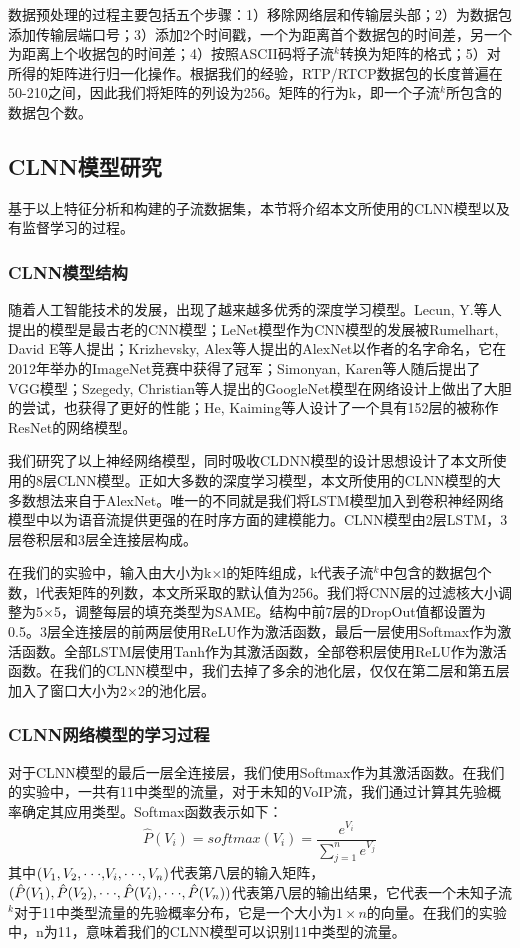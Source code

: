 数据预处理的过程主要包括五个步骤：1）移除网络层和传输层头部；2）为数据包添加传输层端口号；3）添加2个时间戳，一个为距离首个数据包的时间差，另一个为距离上个收据包的时间差；4）按照ASCII码将子流$^k$转换为矩阵的格式；5）对所得的矩阵进行归一化操作。根据我们的经验，RTP/RTCP数据包的长度普遍在50-210之间，因此我们将矩阵的列设为256。矩阵的行为k，即一个子流$^k$所包含的数据包个数。

\subsection{CLNN模型研究}
基于以上特征分析和构建的子流数据集，本节将介绍本文所使用的CLNN模型以及有监督学习的过程。
\subsubsection{CLNN模型结构}
随着人工智能技术的发展，出现了越来越多优秀的深度学习模型。Lecun, Y.等人\supercite{6}提出的模型是最古老的CNN模型；LeNet模型作为CNN模型的发展被Rumelhart, David E\supercite{7}等人提出；Krizhevsky, Alex\supercite{8}等人提出的AlexNet以作者的名字命名，它在2012年举办的ImageNet竞赛中获得了冠军；Simonyan, Karen\supercite{9}等人随后提出了VGG模型；Szegedy, Christian\supercite{10}等人提出的GoogleNet模型在网络设计上做出了大胆的尝试，也获得了更好的性能；He, Kaiming\supercite{11}等人设计了一个具有152层的被称作ResNet的网络模型。

我们研究了以上神经网络模型，同时吸收CLDNN模型\supercite{clnn}的设计思想设计了本文所使用的8层CLNN模型。正如大多数的深度学习模型，本文所使用的CLNN模型的大多数想法来自于AlexNet。唯一的不同就是我们将LSTM模型加入到卷积神经网络模型中以为语音流提供更强的在时序方面的建模能力。CLNN模型由2层LSTM，3层卷积层和3层全连接层构成。

在我们的实验中，输入由大小为k$\times$l的矩阵组成，k代表子流$^k$中包含的数据包个数，l代表矩阵的列数，本文所采取的默认值为256。我们将CNN层的过滤核大小调整为5$\times$5，调整每层的填充类型为SAME。结构中前7层的DropOut值都设置为0.5。3层全连接层的前两层使用ReLU作为激活函数，最后一层使用Softmax作为激活函数。全部LSTM层使用Tanh作为其激活函数，全部卷积层使用ReLU作为激活函数。在我们的CLNN模型中，我们去掉了多余的池化层，仅仅在第二层和第五层加入了窗口大小为2$\times$2的池化层。

\subsubsection{CLNN网络模型的学习过程}
对于CLNN模型的最后一层全连接层，我们使用Softmax作为其激活函数。在我们的实验中，一共有11中类型的流量，对于未知的VoIP流，我们通过计算其先验概率确定其应用类型。Softmax函数表示如下：
\begin{equation}
\hat P({V_i}) = softmax({V_i}) = \frac{{{e^{{V_i}}}}}{{\sum\limits_{j = 1}^n {{e^{{V_j}}}} }}
\end{equation}
其中$({V_1},{V_2},{\rm{\cdot\cdot\cdot,}}{V_i},{\rm{\cdot\cdot\cdot}},{V_n})$代表第八层的输入矩阵，$(\hat P({V_1}),\hat P({V_2}),{\rm{\cdot\cdot\cdot}},\hat P({V_i}),{\rm{\cdot\cdot\cdot}},\hat P({V_n}))$代表第八层的输出结果，它代表一个未知子流$^k$对于11中类型流量的先验概率分布，它是一个大小为$1 \times n$的向量。在我们的实验中，n为11，意味着我们的CLNN模型可以识别11中类型的流量。

